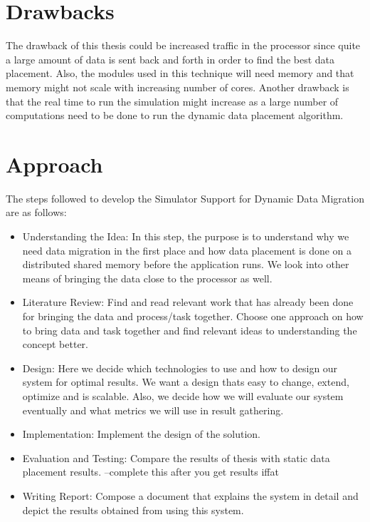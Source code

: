 \documentclass{listhesis}
\begin{document}
\section{Drawbacks}
The drawback of this thesis could be increased traffic in the processor since quite a large amount of data is sent back and forth in order to find the best data placement. Also, the modules used in this technique will need memory and that memory might not scale with increasing number of cores. Another drawback is that the real time to run the simulation might increase as a large number of computations need to be done to run the dynamic data placement algorithm.\\
\section{Approach}
The steps followed to develop the Simulator Support for Dynamic Data Migration are as follows:
\begin{itemize}
  \item Understanding the Idea: In this step, the purpose is to understand why we need data migration in the first place and how data placement is done on a distributed shared memory before the application runs. We look into other means of bringing the data close to the processor as well. 
  \item Literature Review: Find and read relevant work that has already been done for bringing the data and process/task together. Choose one approach on how to bring data and task together and find relevant ideas to understanding the concept better. 
  \item Design: Here we decide which technologies to use and how to design our system for optimal results. We want a design thats easy to change, extend, optimize and is scalable. Also, we decide how we will evaluate our system eventually and what metrics we will use in result gathering. 
  \item Implementation: Implement the design of the solution. 
  \item Evaluation and Testing: Compare the results of thesis with static data placement results. --complete this after you get results iffat
  \item Writing Report: Compose a document that explains the system in detail and depict the results obtained from using this system.
\end{itemize}
\end{document}
